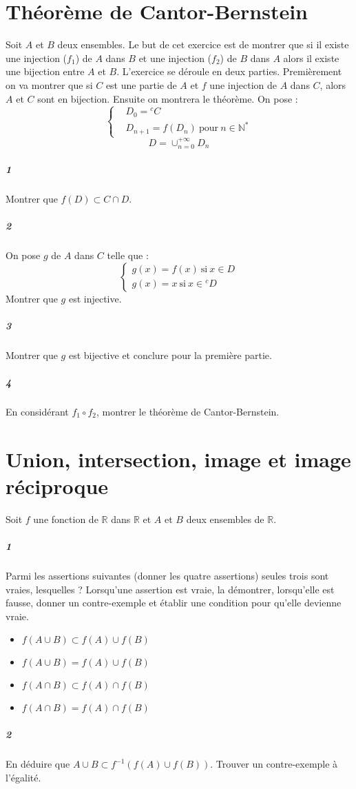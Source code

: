 \documentclass[10pt,a4paper]{article}
\begin{document}
\section{Théorème de Cantor-Bernstein}
Soit $A$ et $B$ deux ensembles. Le but de cet exercice est de montrer que si il existe une injection ($f_1$) de $A$ dans $B$ et une injection ($f_2$) de $B$ dans $A$ alors il existe une bijection entre $A$ et $B$. L'exercice se déroule en deux parties. Premièrement on va montrer que si $C$ est une partie de $A$ et $f$ une injection de $A$ dans $C$, alors $A$ et $C$ sont en bijection. Ensuite on montrera le théorème. On pose :
\begin{equation*}
\left\{
\begin{aligned}
&D_0={}^c C \\
&D_{n+1}=f(D_n) \ \text{pour} \ n \in \mathbb{N}^{*}
\end{aligned}\right.
\end{equation*}
\begin{equation*}
D=\cup_{n=0}^{+\infty} D_n
\end{equation*}
\subparagraph{1}Montrer que $f(D) \subset C \cap D$.
\subparagraph{2}On pose $g$ de $A$ dans $C$ telle que :
\begin{equation*}
\left\{
\begin{aligned}
g(x)=f(x) \ \text{si} \ x \in D \\
g(x)=x \ \text{si} \ x \in {}^cD
\end{aligned}\right.
\end{equation*}
Montrer que $g$ est injective.
\subparagraph{3}Montrer que $g$ est bijective et conclure pour la première partie.
\subparagraph{4}En considérant $f_1 \circ f_2$, montrer le théorème de Cantor-Bernstein.

\section{Union, intersection, image et image réciproque}
Soit $f$ une fonction de $\mathbb{R}$ dans $\mathbb{R}$ et $A$ et $B$ deux ensembles de $\mathbb{R}$.
\subparagraph{1} Parmi les assertions suivantes (donner les quatre assertions) seules trois sont vraies, lesquelles ? Lorsqu'une assertion est vraie, la démontrer, lorsqu'elle est fausse, donner un contre-exemple et établir une condition pour qu'elle devienne vraie.
\begin{itemize}
\item $f(A \cup B) \subset f(A) \cup f(B)$
\item $f(A \cup B) = f(A) \cup f(B)$
\item $f(A \cap B) \subset f(A) \cap f(B)$
\item $f(A \cap B) = f(A) \cap f(B)$
\end{itemize}
\subparagraph{2}En déduire que $ A \cup B\subset f^{-1}(f(A) \cup f(B))$. Trouver un contre-exemple à l'égalité.
\end{document}
